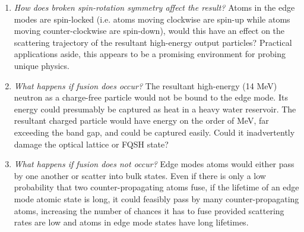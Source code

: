 \documentclass[onecolumn,
               superscriptaddress,
               floatfix,
               longbibliography, 
               showkeys,apl]{revtex4-2}
\begin{document}
\begin{enumerate}
\item \textit{How does broken spin-rotation symmetry affect the result?} Atoms in the edge modes are spin-locked (i.e. atoms moving clockwise are spin-up while atoms moving counter-clockwise are spin-down), would this have an effect on the scattering trajectory of the resultant high-energy output particles? Practical applications aside, this appears to be a promising environment for probing unique physics.
\item \textit{What happens if fusion does occur?} The resultant high-energy (14 MeV) neutron as a charge-free particle would not be bound to the edge mode. Its energy could presumably be captured as heat in a heavy water reservoir. The resultant charged particle would have energy on the order of MeV, far exceeding the band gap, and could be captured easily. Could it inadvertently damage the optical lattice or FQSH state? 
\item \textit {What happens if fusion does not occur?} Edge modes atoms would either pass by one another or scatter into bulk states. Even if there is only a low probability that two counter-propagating atoms fuse, if the lifetime of an edge mode atomic state is long, it could feasibly pass by many counter-propagating atoms, increasing the number of chances it has to fuse provided scattering rates are low and atoms in edge mode states have long lifetimes.
\end{enumerate}




\pagebreak
\end{document}
